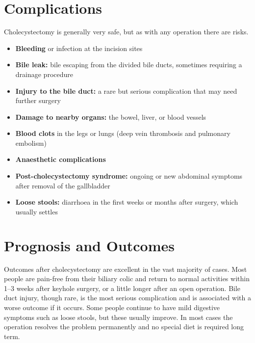 \section*{Complications}
Cholecystectomy is generally very safe, but as with any operation there are risks.

\begin{itemize}
    \item \textbf{Bleeding} or infection at the incision sites
    \item \textbf{Bile leak:} bile escaping from the divided bile ducts, sometimes requiring a drainage procedure
    \item \textbf{Injury to the bile duct:} a rare but serious complication that may need further surgery
    \item \textbf{Damage to nearby organs:} the bowel, liver, or blood vessels
    \item \textbf{Blood clots} in the legs or lungs (deep vein thrombosis and pulmonary embolism)
    \item \textbf{Anaesthetic complications}
    \item \textbf{Post-cholecystectomy syndrome:} ongoing or new abdominal symptoms after removal of the gallbladder
    \item \textbf{Loose stools:} diarrhoea in the first weeks or months after surgery, which usually settles
\end{itemize}

\section*{Prognosis and Outcomes}
Outcomes after cholecystectomy are excellent in the vast majority of cases. Most people are pain-free from their biliary colic and return to normal activities within 1--3 weeks after keyhole surgery, or a little longer after an open operation. Bile duct injury, though rare, is the most serious complication and is associated with a worse outcome if it occurs. Some people continue to have mild digestive symptoms such as loose stools, but these usually improve. In most cases the operation resolves the problem permanently and no special diet is required long term.

